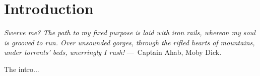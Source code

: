 
\chapter{Introduction}
\label{ch:Introduction}

\begin{epigraph}
    \emph{Swerve me?  The path to my fixed purpose is laid with iron rails, whereon my soul is grooved to run.  Over unsounded gorges, through the rifled hearts of mountains, under torrents' beds, unerringly I rush!} ---~Captain Ahab, Moby Dick.
\end{epigraph}

The intro...
